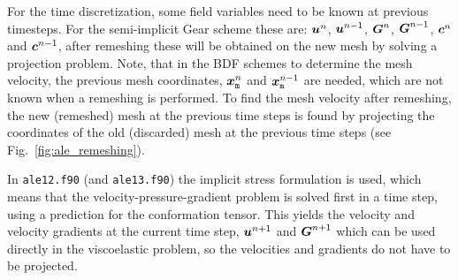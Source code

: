 For the time discretization, some field variables need to be known at previous
timesteps. For the semi-implicit Gear scheme these are:
$\boldsymbol{u}^n$, $\boldsymbol{u}^{n-1}$, $\boldsymbol{G}^n$, $\boldsymbol{G}^{n-1}$, $\boldsymbol{c}^n$
and $\boldsymbol{c}^{n-1}$, after remeshing these will be obtained on the new mesh by solving a projection
problem. Note, that in the BDF schemes to determine the mesh velocity, the previous mesh
coordinates, $\boldsymbol{x}^n_\texttt{m}$ and $\boldsymbol{x} ^{n-1}_\texttt{m}$ are needed, which
are not known when a remeshing is performed. To find the mesh velocity after remeshing, the
new (remeshed) mesh at the previous time steps is found by projecting the coordinates of the
old (discarded) mesh at the previous time steps (see Fig.~\ref{fig:ale_remeshing}).

In \texttt{ale12.f90} (and \texttt{ale13.f90})
the implicit stress formulation is used, which means
that the velocity-pressure-gradient problem
is solved first in a time step, using a prediction for the conformation tensor.
This yields the velocity and velocity gradients
at the current time step, $\boldsymbol{u}^{n+1}$ and $\boldsymbol{G}^{n+1}$ which can be used
directly in the viscoelastic problem, so the velocities
and gradients do not have to be projected. 

